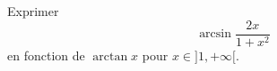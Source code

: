 Exprimer 
\begin{displaymath}
 \arcsin \frac{2x}{1 + x^2}
\end{displaymath}
en fonction de $\arctan x$ pour $x\in]1,+\infty[$.
\bigskip